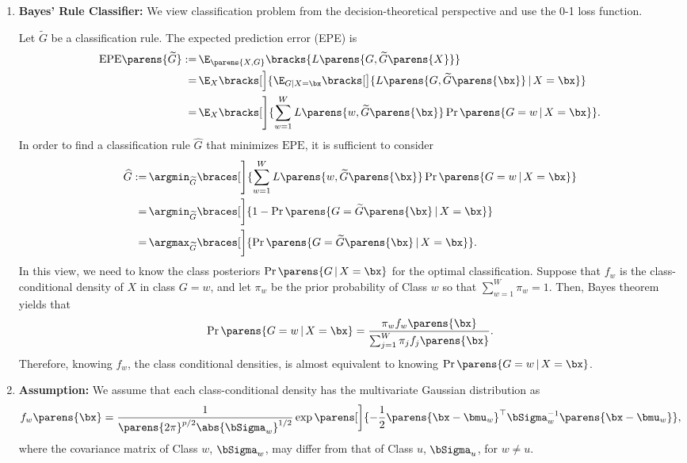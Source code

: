 \documentclass[12pt]{article}
\begin{document}
\begin{enumerate}[label=\textbf{\arabic*.}]
	
	\item \textbf{Bayes' Rule Classifier:} We view classification problem from the decision-theoretical perspective and use the 0-1 loss function. 
	
	Let $\widetilde{G}$ be a classification rule. The expected prediction error (EPE) is 
	\begin{align*}
		\mathrm{EPE} \parens{\widetilde{G}} := & \, \E_{\parens{X, G}} \bracks{L \parens{G, \widetilde{G} \parens{X}}}  \\ 
		= & \, \E_{X} \bracks[\Big]{\E_{G \vert X = \bx} \bracks[\big]{ L \parens{G, \widetilde{G} \parens{\bx}} \,\vert\, X = \bx }} \\ 
		= & \, \E_{X} \bracks[\Bigg]{ \sum_{w=1}^W L \parens{w, \widetilde{G} \parens{\bx}} \Pr \parens{G = w \,\vert\, X = \bx} }. 
	\end{align*}
	In order to find a classification rule $\widehat{G}$ that minimizes $\mathrm{EPE}$, it is sufficient to consider 
	\begin{align}
		\widehat{G} := & \, \argmin_{\widetilde{G}} \braces[\Bigg]{\sum_{w=1}^W L \parens{w, \widetilde{G} \parens{\bx}} \Pr \parens{G = w \,\vert\, X = \bx}} \nonumber \\ 
		= & \, \argmin_{\widetilde{G}} \braces[\bigg]{1 - \Pr \parens{G = \widetilde{G} \parens{\bx} \,\vert\, X = \bx}} \nonumber \\ 
		= & \, \argmax_{\widetilde{G}} \braces[\bigg]{\Pr \parens{G = \widetilde{G} \parens{\bx} \,\vert\, X = \bx}}. \label{eq-bayes-rule-classifier}
	\end{align}
	In this view, we need to know the class posteriors $\Pr \parens{G \,\vert\, X = \bx}$ for the optimal classification. Suppose that $f_w$ is the class-conditional density of $X$ in class $G = w$, and let $\pi_w$ be the prior probability of Class $w$ so that $\sum_{w=1}^W \pi_w = 1$. Then, Bayes theorem yields that 
	\begin{align}
		\Pr \parens{G = w \,\vert\, X = \bx} = \frac{\pi_w f_w \parens{\bx}}{\sum_{j=1}^W \pi_j f_j \parens{\bx}}. 
	\end{align}
	Therefore, knowing $f_w$, the class conditional densities, is almost equivalent to knowing $\Pr \parens{G = w \,\vert\, X = \bx}$. 
	
	\item \textbf{Assumption:} We assume that each class-conditional density has the multivariate Gaussian distribution as 
	\begin{align*}
		f_w \parens{\bx} = \frac{1}{\parens{2\pi}^{p/2} \abs{\bSigma_w}^{1/2}} \exp \parens[\bigg]{-\frac{1}{2} \parens{\bx - \bmu_w}^\top \bSigma_w^{-1} \parens{\bx - \bmu_w}}, 
	\end{align*}
	where the covariance matrix of Class $w$, $\bSigma_w$, may differ from that of Class $u$, $\bSigma_{u}$, for $w \neq u$. 
	

\end{enumerate}
\end{document}

